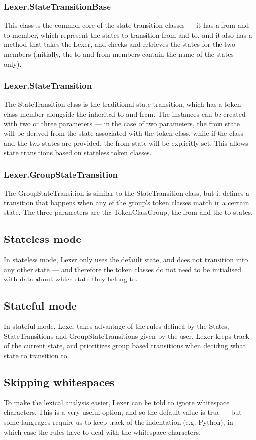 \subsubsection{Lexer.StateTransitionBase}
This class is the common core of the state transition classes --- it has a from and to member, which represent the states to transition from and to, and it also has a method that takes the Lexer, and checks and retrieves the states for the two members (initially, the to and from members contain the name of the states only).
\subsubsection{Lexer.StateTransition}
The StateTransition class is the traditional state transition, which has a token class member alongside the inherited to and from. The instances can be created with two or three parameters --- in the case of two parameters, the from state will be derived from the state associated with the token class, while if the class and the two states are provided, the from state will be explicitly set. This allows state transitions based on stateless token classes.
\subsubsection{Lexer.GroupStateTransition} 
The GroupStateTransition is similar to the StateTransition class, but it defines a transition that happens when any of the group's token classes match in a certain state. The three parameters are the TokenClassGroup, the from and the to states.
\subsection{Stateless mode}
In stateless mode, Lexer only uses the default state, and does not transition into any other state --- and therefore the token classes do not need to be initialised with data about which state they belong to.
\subsection{Stateful mode}
In stateful mode, Lexer takes advantage of the rules defined by the States, StateTransitions and GroupStateTransitions given by the user. Lexer keeps track of the current state, and prioritizes group based transitions when deciding what state to transition to.
\subsection{Skipping whitespaces}
To make the lexical analysis easier, Lexer can be told to ignore whitespace characters. This is a very useful option, and so the default value is true --- but some languages require us to keep track of the indentation (e.g. Python), in which case the rules have to deal with the whitespace characters.
